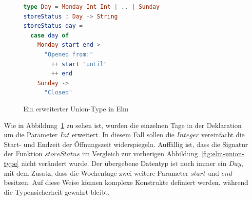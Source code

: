 \begin{figure}[h]
\begin{lstlisting}[language=Elm]
type Day = Monday Int Int | .. | Sunday
storeStatus : Day -> String
storeStatus day =
  case day of
    Monday start end->
      "Opened from:"
      	++ start "until"
      	++ end
    Sunday ->
      "Closed"
\end{lstlisting}
\caption{Ein erweiterter Union-Type in Elm}\label{fig:elm-union-type-advanced}
\end{figure}
Wie in Abbildung~\ref{fig:elm-union-type-advanced} zu sehen ist, wurden die einzelnen Tage in der Deklaration um die Parameter $Int$ erweitert. In diesem Fall sollen die $Integer$ vereinfacht die Start- und Endzeit der Öffnungszeit widerspiegeln. Auffällig ist, dass die Signatur der Funktion $storeStatus$ im Vergleich zur vorherigen Abbildung~\ref{fig:elm-union-type} nicht verändert wurde. Der übergebene Datentyp ist noch immer ein $Day$, mit dem Zusatz, dass die Wochentage zwei weitere Parameter $start$ und $end$ besitzen. Auf diese Weise können komplexe Konstrukte definiert werden, während die Typensicherheit gewahrt bleibt.

